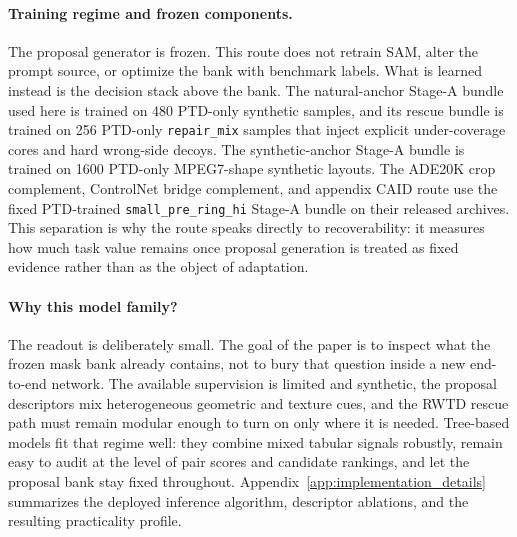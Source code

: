 \paragraph{Training regime and frozen components.} The proposal generator is frozen. This route does not retrain SAM, alter the prompt source, or optimize the bank with benchmark labels. What is learned instead is the decision stack above the bank. The natural-anchor Stage-A bundle used here is trained on 480 PTD-only synthetic samples, and its rescue bundle is trained on 256 PTD-only \texttt{repair\_mix} samples that inject explicit under-coverage cores and hard wrong-side decoys. The synthetic-anchor Stage-A bundle is trained on 1600 PTD-only MPEG7-shape synthetic layouts. The ADE20K crop complement, ControlNet bridge complement, and appendix CAID route use the fixed PTD-trained \texttt{small\_pre\_ring\_hi} Stage-A bundle on their released archives. This separation is why the route speaks directly to recoverability: it measures how much task value remains once proposal generation is treated as fixed evidence rather than as the object of adaptation.

\paragraph{Why this model family?} The readout is deliberately small. The goal of the paper is to inspect what the frozen mask bank already contains, not to bury that question inside a new end-to-end network. The available supervision is limited and synthetic, the proposal descriptors mix heterogeneous geometric and texture cues, and the RWTD rescue path must remain modular enough to turn on only where it is needed. Tree-based models fit that regime well: they combine mixed tabular signals robustly, remain easy to audit at the level of pair scores and candidate rankings, and let the proposal bank stay fixed throughout. Appendix~\ref{app:implementation_details} summarizes the deployed inference algorithm, descriptor ablations, and the resulting practicality profile.
